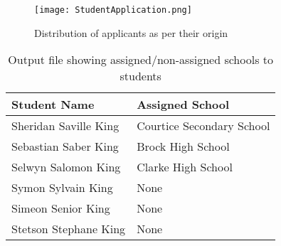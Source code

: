 \documentclass[twocolumn]{bmcart}
\begin{document}
		\begin{figure}[h!]
			\centering
			\texttt{[image: StudentApplication.png]}
			\caption{Distribution of applicants as per their origin}
			\label{fig:allocation}
		\end{figure}
		
		{\small
			\begin{table}[h!]
				\centering
				\small
				\caption{Output file showing assigned/non-assigned schools to students}
				\label{table:review}
				\begin{tabular}{| p{3cm}| p{3cm}| }
					\hline
					Student Name & Assigned School \\ \hline
					
					Sheridan Saville King & Courtice Secondary School\\\hline
					
					Sebastian Saber King & Brock High School\\\hline
					
					Selwyn Salomon King & Clarke High School\\\hline
					
					Symon Sylvain King & None\\\hline
					
					Simeon Senior King & None\\\hline
					
					Stetson Stephane King & None\\\hline
					
					
				\end{tabular}%
			\end{table}%
		}
\end{document}
